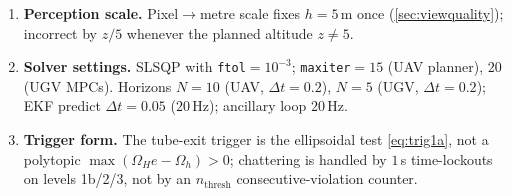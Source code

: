 \documentclass[11pt]{article}
\newcommand{\code}[1]{\texttt{#1}}
\begin{document}
\begin{enumerate}
\item \textbf{Perception scale.} Pixel$\to$metre scale fixes $h=5$\,m once (\cref{sec:viewquality}); incorrect
by $z/5$ whenever the planned altitude $z\ne5$.

\item \textbf{Solver settings.} SLSQP with \code{ftol}$=10^{-3}$; \code{maxiter}$=15$ (UAV planner),
$20$ (UGV MPCs). Horizons $N=10$ (UAV, $\Delta t=0.2$), $N=5$ (UGV, $\Delta t=0.2$); EKF predict
$\Delta t=0.05$ ($20$\,Hz); ancillary loop $20$\,Hz.

\item \textbf{Trigger form.} The tube-exit trigger is the ellipsoidal test \cref{eq:trig1a}, not a polytopic
$\max(\Omega_H e-\Omega_h)>0$; chattering is handled by $1$\,s time-lockouts on levels 1b/2/3, not by an
$n_{\text{thresh}}$ consecutive-violation counter.
\end{enumerate}



\end{document}
